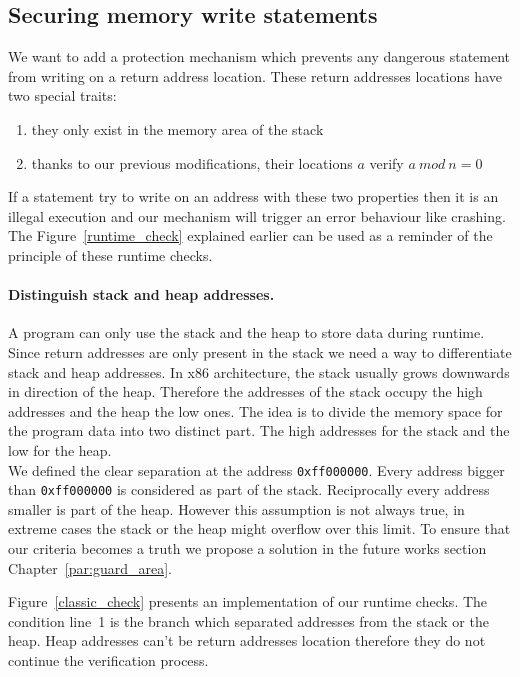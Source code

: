 \documentclass[11pt]{sdm}
\begin{document}
\subsection{Securing memory write statements}
\label{sub:implem_check_address}
We want to add a protection mechanism which prevents any dangerous statement from writing on a return address location. These return addresses locations have two special traits:
\begin{enumerate}
	\item they only exist in the memory area of the stack
	\item thanks to our previous modifications, their locations $a$ verify $a~mod~n=0$
\end{enumerate}
If a statement try to write on an address with these two properties then it is an illegal execution and our mechanism will trigger an error behaviour like crashing. The Figure~\ref{runtime_check} explained earlier can be used as a reminder of the principle of these runtime checks.

\paragraph{Distinguish stack and heap addresses.}
\label{par:Distinguish stack or heap}
A program can only use the stack and the heap to store data during runtime. Since return addresses are only present in the stack we need a way to differentiate stack and heap addresses.
In x86 architecture, the stack usually grows downwards in direction of the heap. Therefore the addresses of the stack occupy the high addresses and the heap the low ones. 
The idea is to divide the memory space for the program data into two distinct part. The high addresses for the stack and the low for the heap. \\
We defined the clear separation at the address \texttt{0xff000000}. Every address bigger than \texttt{0xff000000} is considered as part of the stack. Reciprocally every address smaller is part of the heap. However this assumption is not always true, in extreme cases the stack or the heap might overflow over this limit. To ensure that our criteria becomes a truth we propose a solution in the future works section Chapter~\ref{par:guard_area}.

Figure~\ref{classic_check} presents an implementation of our runtime checks. The condition line~1 is the branch which separated addresses from the stack or the heap. Heap addresses can't be return addresses location therefore they do not continue the verification process.
\end{document}
